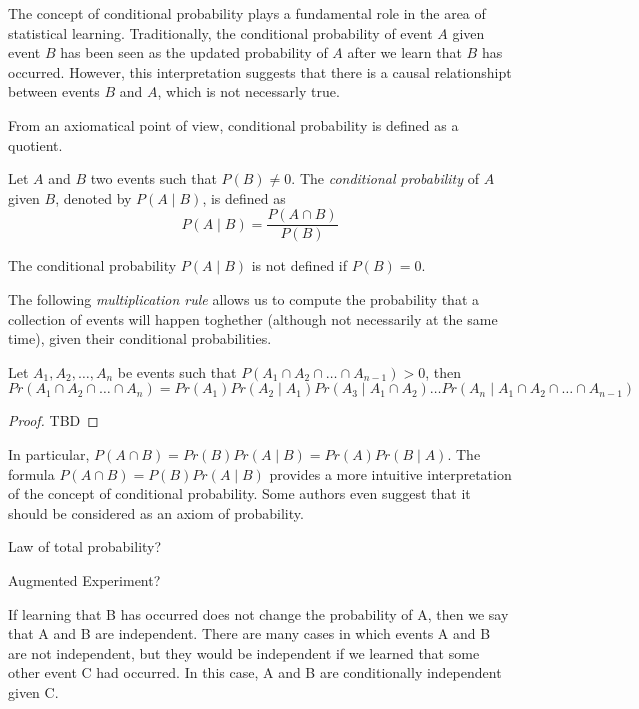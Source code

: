 The concept of conditional probability plays a fundamental role in the area of statistical learning. Traditionally, the conditional probability of event $A$ given event $B$ has been seen as the updated probability of $A$ after we learn that $B$ has occurred. However, this interpretation suggests that there is a causal relationshipt between events $B$ and $A$, which is not necessarly true.

From an axiomatical point of view, conditional probability is defined as a quotient.

\begin{definition}
Let $A$ and $B$ two events such that $P \left( B \right) \neq 0$. The \emph{conditional probability} of $A$ given $B$, denoted by $P\left(A\mid B\right)$, is defined as
\[
P\left(A\mid B\right) = \frac{P\left(A\cap B\right)}{P\left(B\right)}
\]
\end{definition}

The conditional probability $P\left(A\mid B\right)$ is not defined if $P\left(B\right)=0$.

The following \emph{multiplication rule} allows us to compute the probability that a collection of events will happen toghether (although not necessarily at the same time), given their conditional probabilities.

\begin{proposition}
Let $A_{1}, A_{2},\ldots,A_{n}$ be events such that $P\left(A_{1} \cap A_{2} \cap \ldots \cap A_{n-1}\right)>0$, then
\[
Pr\left(A_{1}\cap A_{2}\cap\ldots\cap A_{n}\right)=Pr\left(A_{1}\right)Pr\left(A_{2}\mid A_{1}\right)Pr\left(A_{3}\mid A_{1}\cap A_{2}\right)\ldots Pr\left(A_{n}\mid A_{1}\cap A_{2}\cap\ldots\cap A_{n-1}\right)
\]
\end{proposition}
\begin{proof}
{\color{red} TBD}
\end{proof}

In particular, $P\left(A\cap B\right) = Pr\left(B\right)Pr\left(A\mid B\right)=Pr\left(A\right)Pr\left(B\mid A\right)$. The formula $P\left(A\cap B\right) = P\left(B\right)Pr\left(A\mid B\right)$ provides a more intuitive interpretation of the concept of conditional probability. Some authors even suggest that it should be considered as an axiom of probability.

Law of total probability?

Augmented Experiment?

{\color{red} If learning that B has occurred does not change the probability of A, then we say that A and B are independent. There are many cases in which events A and B are not independent, but they would be independent if we learned that some other event C had occurred. In this case, A and B are conditionally independent given C.}

